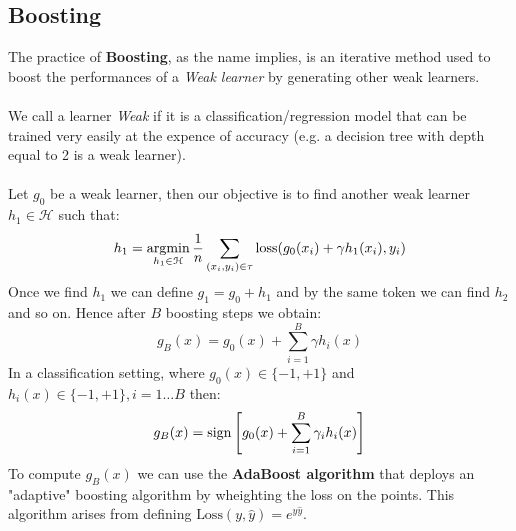 \subsection{Boosting}
The practice of \textbf{Boosting}, as the name implies, is an iterative method used to boost the performances of a \textit{Weak learner} by generating other weak learners. \\
\\
We call a learner \textit{Weak} if it is a classification/regression model that can be trained very easily at the expence of accuracy (e.g. a decision tree with depth equal to 2 is a weak learner).\\
\\
Let \(g_0\) be a weak learner, then our objective is to find another weak learner \(h_1 \in \mathcal{H}\) such that:
\begin{equation}
    h_1 = \operatorname*{argmin}_{h_1 \in \mathcal{H}} \frac{1}{n}  \sum \limits_{(x_i, y_i) \in \tau}^{} \text{loss}(g_0(x_i) + \gamma h_1(x_i), y_i) 
\end{equation}
Once we find \(h_1\) we can define \(g_1 = g_0 + h_1\) and by the same token we can find \(h_2\) and so on. Hence after \(B\) boosting steps we obtain:
\begin{equation}
    g_B(x) = g_0(x) +  \sum \limits_{i= 1}^{B} \gamma h_i(x)
\end{equation}
In a classification setting, where \(g_0(x) \in \{- 1, + 1\}\) and \(h_i(x) \in \{- 1, + 1\}, i= 1\dots B\) then:
\begin{equation}
    g_B(x) = \mathrm{sign} \left[g_0(x) +  \sum \limits_{i= 1}^{B} \gamma_i h_i(x)\right]
\end{equation}
To compute \(g_B(x)\) we can use the \textbf{AdaBoost algorithm} that deploys an "adaptive" boosting algorithm by wheighting the loss on the points. This algorithm arises from defining \(\text{Loss}(y, \hat{y}) = e^{y\hat{y}}\). 
